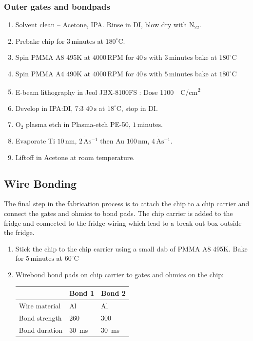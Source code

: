 \subsubsection{Outer gates and bondpads }

\begin{enumerate}
\item Solvent clean – Acetone, IPA. Rinse in DI, blow dry with $\mathrm{N_22}$.
\item Prebake chip for $3\,\mathrm{minutes}$ at $180^\circ$C.
\item Spin PMMA A8 495K at $4000\,\mathrm{RPM}$ for $40\,\mathrm{s}$  with $3\,\mathrm{minutes}$ bake at $180^\circ$C
\item Spin PMMA A4 490K at $4000\,\mathrm{RPM}$ for $40\,\mathrm{s}$  with $5\,\mathrm{minutes}$ bake at $180^\circ$C
\item E-beam lithography in Jeol JBX-8100FS : Dose \qty{1100}{\mu C/cm^2}
\item Develop in IPA:DI, 7:3 $40\,\mathrm{s}$ at $18^\circ$C, stop in DI.
\item $\mathrm{O_2}$ plasma etch in Plasma-etch PE-50, $1\,\mathrm{minutes}$.
\item Evaporate Ti $10\,\mathrm{nm}$, $2\,\mathrm{\dot{A}s^{-1}}$ then Au $100\,\mathrm{nm}$, $4\,\mathrm{\dot{A}s^{-1}}$.
\item Liftoff in Acetone at room temperature.
\end{enumerate}




\subsection{Wire Bonding}

The final step in the fabrication process is to attach the chip to a chip carrier and connect the gates and ohmics to bond pads. The chip carrier is added to the fridge and connected to the fridge wiring which lead to a break-out-box outside the fridge. 


\begin{enumerate}
\item Stick the chip to the chip carrier using a small dab of PMMA A8 495K. Bake for $5\,\mathrm{minutes}$ at $60^\circ$C
\item Wirebond bond pads on chip carrier to gates and ohmics on the chip:
\begin{table}[H]     
\centering
  \begin{tabular}{|p{3.0cm}|p{2.0cm}|p{2.0cm}|}
    \hline
     & Bond 1 & Bond 2\\
    \hline
    Wire material & Al & Al\\
    Bond strength & 260 & 300\\
    Bond duration & \qty{30}{ms} & \qty{30}{ms} \\
    \hline
  \end{tabular}
\label{tab:wire_bonding}
\end{table}
\end{enumerate}